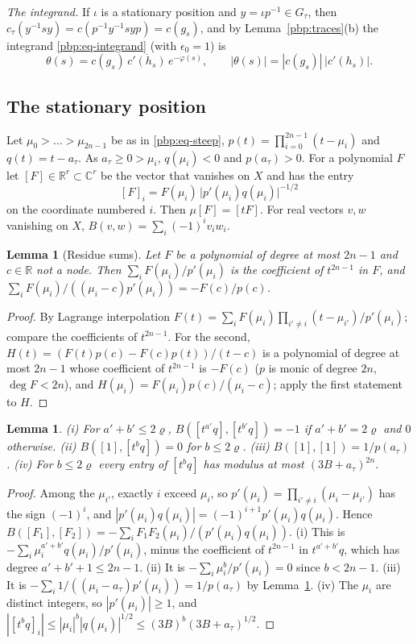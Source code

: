 \documentclass[10pt]{amsart}
\newtheorem{lemma}[theorem]{Lemma}
\theoremstyle{definition}
\theoremstyle{remark}
\newcommand{\C}{\mathbb C}
\newcommand{\R}{\mathbb R}
\providecommand{\aubar}[1]{\overline{#1}}
\begin{document}
\emph{The integrand.} If $\iota$ is a stationary position and $y=\iota p^{-1}\in G_\tau$, then
$c_\tau(y^{-1}sy)=c(p^{-1}y^{-1}syp)=c(g_s)$, and by Lemma~\ref{pbp:traces}(b) the integrand
\eqref{pbp:eq-integrand} (with $\epsilon_0=1$) is
\begin{equation}\label{pbp:eq-theta}
\theta(s)=c(g_s)\,\aubar{c'(h_s)}\,e^{-\varphi(s)},\qquad|\theta(s)|=|c(g_s)|\,|c'(h_s)|.
\end{equation}

\subsection{The stationary position}\label{pbp:ss-stationary}

Let $\mu_0>\dots>\mu_{2n-1}$ be as in \eqref{pbp:eq-steep}, $p(t)=\prod_{i=0}^{2n-1}(t-\mu_i)$ and
$q(t)=t-a_\tau$. As $a_\tau\ge0>\mu_i$, $q(\mu_i)<0$ and $p(a_\tau)>0$. For a polynomial $F$ let
$[F]\in\R^r\subset\C^r$ be the vector that vanishes on $X$ and has the entry
\[
[F]_i=F(\mu_i)\,\bigl|p'(\mu_i)q(\mu_i)\bigr|^{-1/2}
\]
on the coordinate numbered $i$. Then $\mu[F]=[tF]$. For real vectors $v,w$ vanishing on $X$,
$B(v,w)=\sum_i(-1)^iv_iw_i$.

\begin{lemma}[Residue sums]\label{pbp:residue}
Let $F$ be a polynomial of degree at most $2n-1$ and $c\in\R$ not a node. Then
$\sum_iF(\mu_i)/p'(\mu_i)$ is the coefficient of $t^{2n-1}$ in $F$, and $\sum_iF(\mu_i)/((\mu_i-c)
p'(\mu_i))=-F(c)/p(c)$.
\end{lemma}
\begin{proof}
By Lagrange interpolation $F(t)=\sum_iF(\mu_i)\prod_{i'\ne i}(t-\mu_{i'})/p'(\mu_i)$; compare the
coefficients of $t^{2n-1}$. For the second, $H(t)=(F(t)p(c)-F(c)p(t))/(t-c)$ is a polynomial of degree
at most $2n-1$ whose coefficient of $t^{2n-1}$ is $-F(c)$ ($p$ is monic of degree $2n$, $\deg F<2n$), and
$H(\mu_i)=F(\mu_i)p(c)/(\mu_i-c)$; apply the first statement to $H$.
\end{proof}

\begin{lemma}\label{pbp:gram}
\textup{(i)} For $a'+b'\le2\varrho$, $B([t^{a'}q],[t^{b'}q])=-1$ if $a'+b'=2\varrho$ and $0$ otherwise.
\textup{(ii)} $B([1],[t^bq])=0$ for $b\le2\varrho$. \textup{(iii)} $B([1],[1])=1/p(a_\tau)$.
\textup{(iv)} For $b\le2\varrho$ every entry of $[t^bq]$ has modulus at most $(3B+a_\tau)^{2n}$.
\end{lemma}
\begin{proof}
Among the $\mu_{i'}$, exactly $i$ exceed $\mu_i$, so $p'(\mu_i)=\prod_{i'\ne i}(\mu_i-\mu_{i'})$ has the
sign $(-1)^i$, and $|p'(\mu_i)q(\mu_i)|=(-1)^{i+1}p'(\mu_i)q(\mu_i)$. Hence
$B([F_1],[F_2])=-\sum_iF_1F_2(\mu_i)/(p'(\mu_i)q(\mu_i))$. (i) This is $-\sum_i\mu_i^{a'+b'}q(\mu_i)/
p'(\mu_i)$, minus the coefficient of $t^{2n-1}$ in $t^{a'+b'}q$, which has degree $a'+b'+1\le2n-1$.
(ii) It is $-\sum_i\mu_i^b/p'(\mu_i)=0$ since $b<2n-1$. (iii) It is $-\sum_i1/((\mu_i-a_\tau)
p'(\mu_i))=1/p(a_\tau)$ by Lemma~\ref{pbp:residue}. (iv) The $\mu_i$ are distinct integers, so
$|p'(\mu_i)|\ge1$, and $|[t^bq]_i|\le|\mu_i|^b|q(\mu_i)|^{1/2}\le(3B)^b(3B+a_\tau)^{1/2}$.
\end{proof}
\end{document}

